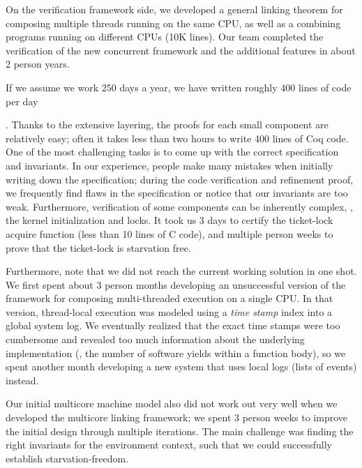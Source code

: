 {On the verification framework side, we developed a general linking
theorem for composing multiple threads running on the same CPU, as
well as a combining programs running on
different CPUs (10K lines).
Our team completed the verification of the new concurrent framework
and the additional features in about 2 person years. 
 If we assume we work 250
days a year, we have written roughly 400 lines of code per
day.  Thanks to the extensive layering,
the proofs for each small component are relatively easy; often it
takes less than two hours to write 400 lines of Coq code.  One of the
most challenging tasks is to come up with the correct specification
and invariants. In our experience, people make many mistakes when
initially writing down the specification; during the code verification
and refinement proof, we frequently find flaws in the specification or
notice that our invariants are too weak.  Furthermore, verification of
some components can be inherently complex, \eg, the kernel
initialization and locks.  It took us 3 days to certify the
ticket-lock acquire function (less than 10 lines of C code), and
multiple person weeks to prove that the ticket-lock is
starvation free.


Furthermore, note that we did not reach the current working solution
in one shot. We first spent about 3 person months developing an
unsuccessful version of the framework for composing multi-threaded
execution on a single CPU.  In that version, thread-local execution
was modeled using a \emph{time stamp} index into a global system
log. We eventually realized that the exact time stamps were too
cumbersome and revealed too much information about the underlying
implementation (\eg, the number of software yields within a function
body), so we spent another month developing a new system that uses
local logs (lists of events) instead.  Our initial
multicore machine model also did not work out very well when we
developed the multicore linking framework; we spent 3 person weeks to
improve the initial design through multiple iterations.  The main
challenge was finding the right invariants for the environment
context, such that we could successfully establish starvation-freedom.
}

